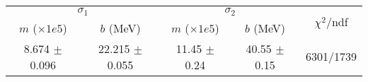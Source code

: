 \begin{tabular}{cc|cc||c}
\multicolumn{2}{c|}{$\sigma_1$} & \multicolumn{2}{|c}{$\sigma_2$} & \multirow{2}{*}{$\chi^2/$ndf} \\
$m$ ($\times1e5$) & $b$ (MeV) & $m$ ($\times1e5$) & $b$ (MeV) & \\
\hline
8.674 $\pm$ 0.096 & 22.215 $\pm$ 0.055 & 11.45 $\pm$ 0.24 & 40.55 $\pm$ 0.15 & 6301/1739\\
\end{tabular}
